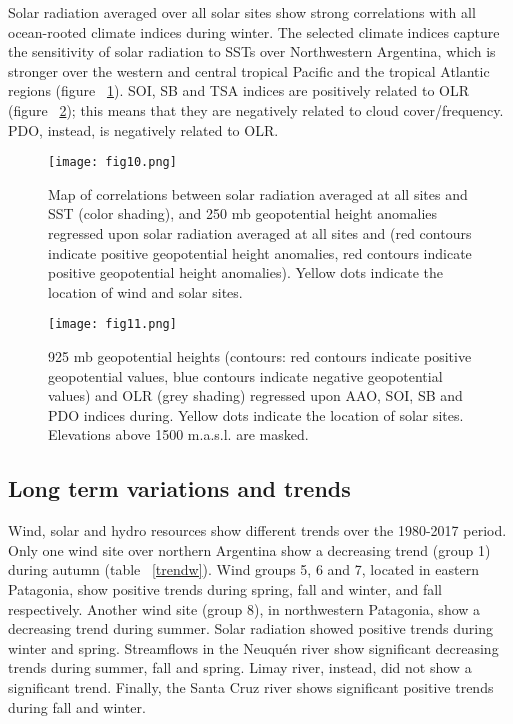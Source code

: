\documentclass[AMA,Times1COL]{WileyNJDv5} %
\begin{document}
\begin{linenumbers}
Solar radiation averaged over all solar sites show strong correlations with all ocean-rooted climate indices during winter. The selected climate indices capture the sensitivity of solar radiation to SSTs over Northwestern Argentina, which is stronger over the western and central tropical Pacific and the tropical Atlantic regions (figure ~\ref{sst}). SOI, SB and TSA indices are positively related to OLR (figure ~\ref{reg3}); this means that they are negatively related to cloud cover/frequency. PDO, instead, is negatively related to OLR. 

\begin{figure}[hbpt]
	\centering
	\hspace*{0cm}   
	\texttt{[image: fig10.png]}
	\caption{\label{sst} Map of correlations between solar radiation averaged at all sites and SST (color shading), and 250 mb geopotential height anomalies regressed upon  solar radiation averaged at all sites and (red contours indicate positive geopotential height anomalies, red contours indicate positive geopotential height anomalies). Yellow dots indicate the location of wind and solar sites.}
\end{figure}

\begin{figure}[hbpt]
	\centering
	\hspace*{-1cm}   
	\texttt{[image: fig11.png]}
	\caption{\label{reg3} 925 mb geopotential heights (contours: red contours indicate positive geopotential values, blue contours indicate negative geopotential values) and OLR  (grey shading) regressed upon AAO, SOI, SB and PDO indices during. Yellow dots indicate the location of solar sites. Elevations above 1500 m.a.s.l. are masked.}
\end{figure}

\subsection{Long term variations and trends}

Wind, solar and hydro resources show different trends over the 1980-2017 period. Only one wind site over northern Argentina show a decreasing trend (group 1) during autumn (table ~\ref{trendw}). Wind groups 5, 6 and 7, located in eastern Patagonia, show positive trends during spring, fall and winter, and fall respectively. Another wind site (group 8), in northwestern Patagonia, show a decreasing trend during summer. Solar radiation showed positive trends during winter and spring. Streamflows in the Neuquén river show significant decreasing trends during summer, fall and spring. Limay river, instead, did not show a significant trend. Finally, the Santa Cruz river shows significant positive trends during fall and winter. 


\end{linenumbers}
\end{document}
